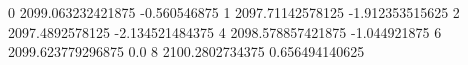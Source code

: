 0 2099.063232421875 -0.560546875
1 2097.71142578125 -1.912353515625
2 2097.4892578125 -2.134521484375
4 2098.578857421875 -1.044921875
6 2099.623779296875 0.0
8 2100.2802734375 0.656494140625
